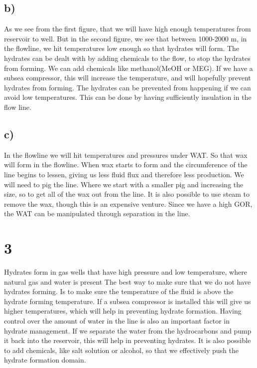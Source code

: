 \documentclass[DIV=calc, paper=a4, fontsize=13pt, twocolumn]{scrartcl}	 %
\begin{document}
\subsection*{b)}
As we see from the first figure, that we will have high enough temperatures from reservoir to well. But in the second figure, we see that between 1000-2000 m, in the flowline, we hit temperatures low enough so that hydrates will form. 
The hydrates can be dealt with by adding chemicals to the flow, to stop the hydrates from forming. We can add chemicals like methanol(MeOH or MEG). 
\newline
If we have a subsea compressor, this will increase the temperature, and will hopefully prevent hydrates from forming. 
\newline
The hydrates can be prevented from happening if we can avoid low temperatures. This can be done by having sufficiently insulation in the flow line.
\subsection*{c)}
In the flowline we will hit temperatures and pressures under WAT. So that wax will form in the flowline. When wax starts to form and the circumference of the line begins to lessen, giving us less fluid flux and therefore less production. We will need to pig the line. Where we start with a smaller pig and increasing the size, so to get all of the wax out from the line. It is also possible to use steam to remove the wax, though this is an expensive venture.
Since we have a high GOR, the WAT can be manipulated through separation in the line.
\newline

\section*{3}
Hydrates form in gas wells that have high pressure and low temperature, where natural gas and water is present
The best way to make sure that we do not have hydrates forming. Is to make sure the temperature of the fluid is above the hydrate forming temperature. If a subsea compressor is installed this will give us higher temperatures, which will help in preventing hydrate formation.
\newline
Having control over the amount of water in the line is also an important factor in hydrate management. If we separate the water from the hydrocarbons and pump it back into the reservoir, this will help in preventing hydrates.
\newline
It is also possible to add chemicals, like salt solution or alcohol, so that we effectively push the hydrate formation domain.
\end{document}

